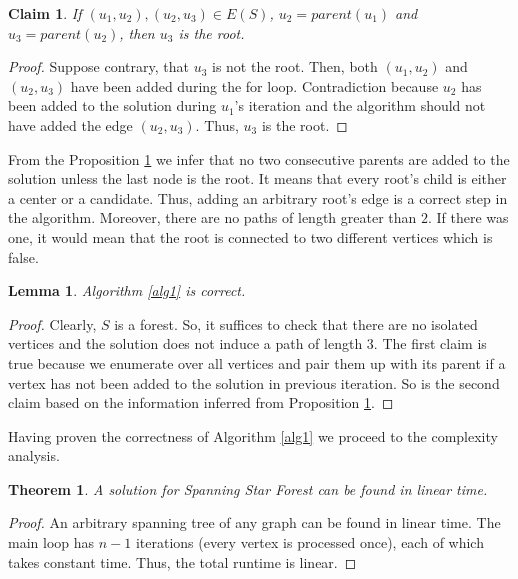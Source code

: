 \documentclass[en]{pracamgr}
\newtheorem{theorem}{Theorem}
\newtheorem{lemma}{Lemma}
\newtheorem{claim}{Claim}
\newcommand{\ssfp}{{\sc Spanning Star Forest}}
\begin{document}
\begin{claim}\label{ssf root}
	If $(u_1,u_2),(u_2,u_3) \in E(S)$, $u_2 = parent(u_1)$ and $u_3=parent(u_2)$, then $u_3$ is the root.
\end{claim}

\begin{proof}
	Suppose contrary, that $u_3$ is not the root. Then, both $(u_1,u_2)$ and $(u_2,u_3)$ have been added during the for loop. Contradiction because $u_2$ has been added to the solution during $u_1$'s iteration and the algorithm should not have added the edge $(u_2,u_3)$. Thus, $u_3$ is the root.
\end{proof}

From the Proposition \ref{ssf root} we infer that no two consecutive parents are added to the solution unless the last node is the root. It means that every root's child is either a center or a candidate. Thus, adding an arbitrary root's edge is a correct step in the algorithm. Moreover, there are no paths of length greater than $2$. If there was one, it would mean that the root is connected to two different vertices which is false.

\begin{lemma}\label{alg1 correctness}
	Algorithm \ref{alg1} is correct.
\end{lemma}

\begin{proof}
	Clearly, $S$ is a forest. So, it suffices to check that there are no isolated vertices and the solution does not induce a path of length $3$. The first claim is true because we enumerate over all vertices and pair them up with its parent if a vertex has not been added to the solution in previous iteration. So is the second claim based on the information inferred from Proposition \ref{ssf root}.
\end{proof}

Having proven the correctness of Algorithm \ref{alg1} we proceed to the complexity analysis.

\begin{theorem}
	A solution for \ssfp{} can be found in linear time.
\end{theorem}

\begin{proof}
	An arbitrary spanning tree of any graph can be found in linear time. The main loop has $n-1$ iterations (every vertex is processed once), each of which takes constant time.
	Thus, the total runtime is linear.
\end{proof}
\end{document}
